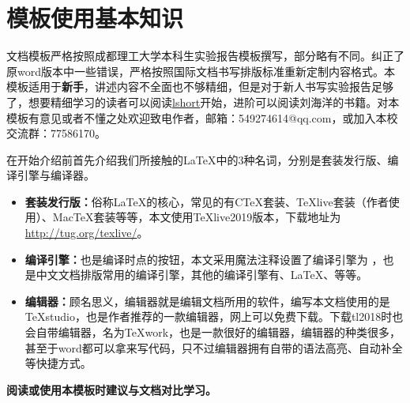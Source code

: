\section{模板使用基本知识}
文档模板严格按照成都理工大学本科生实验报告模板撰写，部分略有不同。纠正了原word版本中一些错误，严格按照国际文档书写排版标准重新定制内容格式。本模板适用于\textbf{新手}，讲述内容不全面也不够精细，但是对于新人书写实验报告足够了，想要精细学习的读者可以阅读\href{http://mirror.lzu.edu.cn/CTAN/info/lshort/chinese/lshort-zh-cn.pdf}{lshort}开始，进阶可以阅读刘海洋的书籍。对本模板有意见或者不懂之处欢迎致电作者，邮箱：549274614@qq.com，或加入本校交流群：77586170。

在开始介绍前首先介绍我们所接触的\LaTeX 中的3种名词，分别是套装发行版、编译引擎与编译器。
\begin{itemize}
\item \textbf{套装发行版：}俗称\LaTeX 的核心，常见的有CTeX套装、TeXlive套装（作者使用）、MacTeX套装等等，本文使用TeXlive2019版本，下载地址为\url{http://tug.org/texlive/}。

\item \textbf{编译引擎：}也是编译时点的按钮，本文采用魔法注释设置了编译引擎为 ，也是中文文档排版常用的编译引擎，其他的编译引擎有、\LaTeX{}、等等。
 
\item \textbf{编辑器：}顾名思义，编辑器就是编辑文档所用的软件，编写本文档使用的是TeXstudio，也是作者推荐的一款编辑器，网上可以免费下载。下载tl2018时也会自带编辑器，名为TeXwork，也是一款很好的编辑器，编辑器的种类很多，甚至于word都可以拿来写代码，只不过编辑器拥有自带的语法高亮、自动补全等快捷方式。
\end{itemize}

\textbf{阅读或使用本模板时建议与文档对比学习。}
